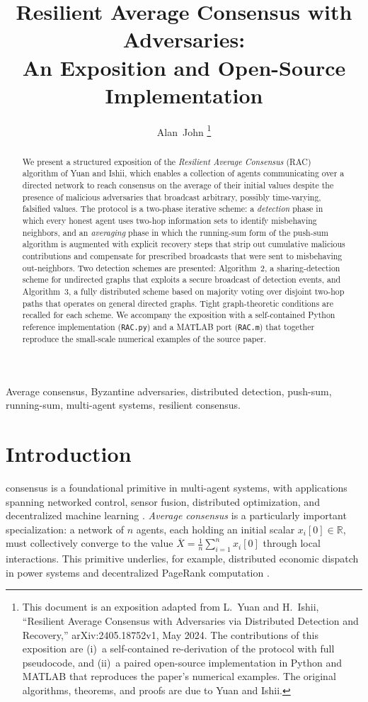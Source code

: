 \documentclass[journal]{IEEEtran}
\title{Resilient Average Consensus with Adversaries: \\
       An Exposition and Open-Source Implementation}
\author{Alan~John%
\thanks{This document is an exposition adapted from L.\ Yuan and H.\ Ishii,
``Resilient Average Consensus with Adversaries via Distributed Detection and
Recovery,'' arXiv:2405.18752v1, May 2024.  The contributions of this exposition
are (i)~a self-contained re-derivation of the protocol with full pseudocode,
and (ii)~a paired open-source implementation in Python and MATLAB that
reproduces the paper's numerical examples.  The original algorithms,
theorems, and proofs are due to Yuan and Ishii.}}
\begin{document}
\maketitle

\begin{abstract}
We present a structured exposition of the \emph{Resilient Average Consensus}
(RAC) algorithm of Yuan and Ishii, which enables a collection of agents
communicating over a directed network to reach consensus on the average of
their initial values despite the presence of malicious adversaries that
broadcast arbitrary, possibly time-varying, falsified values.  The protocol is
a two-phase iterative scheme: a \emph{detection} phase in which every honest
agent uses two-hop information sets to identify misbehaving neighbors, and an
\emph{averaging} phase in which the running-sum form of the push-sum algorithm
is augmented with explicit recovery steps that strip out cumulative malicious
contributions and compensate for prescribed broadcasts that were sent to
misbehaving out-neighbors.  Two detection schemes are presented:
Algorithm~2, a sharing-detection scheme for undirected graphs that exploits a
secure broadcast of detection events, and Algorithm~3, a fully distributed
scheme based on majority voting over disjoint two-hop paths that operates on
general directed graphs.  Tight graph-theoretic conditions are recalled for
each scheme.  We accompany the exposition with a self-contained Python
reference implementation (\texttt{RAC.py}) and a MATLAB port
(\texttt{RAC.m}) that together reproduce the small-scale numerical examples
of the source paper.
\end{abstract}

\begin{IEEEkeywords}
Average consensus, Byzantine adversaries, distributed detection, push-sum,
running-sum, multi-agent systems, resilient consensus.
\end{IEEEkeywords}

\section{Introduction}
 consensus is a foundational primitive in
multi-agent systems, with applications spanning networked control, sensor
fusion, distributed optimization, and decentralized machine learning
\cite{olfati2007consensus}.  \emph{Average consensus} is a particularly
important specialization: a network of $n$ agents, each holding an initial
scalar $x_i[0]\in\mathbb{R}$, must collectively converge to the value
$\overline{X}=\tfrac{1}{n}\sum_{i=1}^n x_i[0]$ through local interactions.
This primitive underlies, for example, distributed economic dispatch in
power systems and decentralized PageRank computation
\cite{yang2013economic,ishii2014pagerank}.
\end{document}
